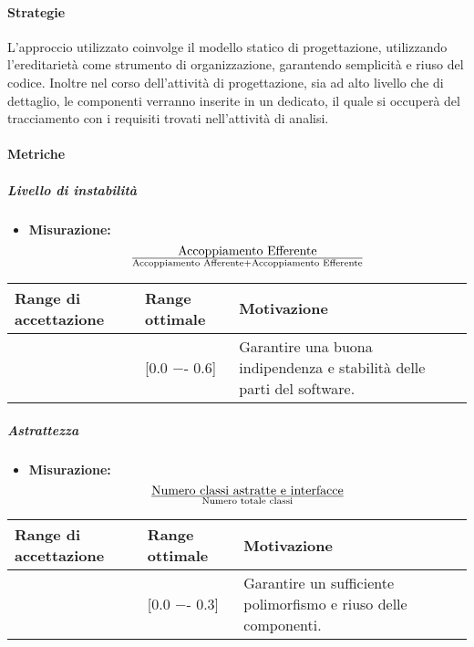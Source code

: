 \paragraph{Strategie}
L'approccio utilizzato coinvolge il modello statico di progettazione, utilizzando l'ereditarietà come strumento di organizzazione, garantendo semplicità e riuso del codice.
Inoltre nel corso dell'attività di progettazione, sia ad alto livello che di dettaglio, le componenti verranno inserite in un  dedicato, il quale si occuperà del tracciamento con i requisiti trovati nell'attività di analisi.


\paragraph{Metriche}

\subparagraph{Livello di instabilità}

\begin{itemize}
\item \textbf{Misurazione:} 
\begin{displaymath}
{\text{Accoppiamento Efferente}}\over{\text{Accoppiamento Afferente} + \text{Accoppiamento Efferente}}
\end{displaymath} 
\end{itemize}

\begin{center}
		\begin{tabular}{|P{2.5cm}|P{2.5cm}|P{6cm}|}
		\hline
			\textbf{Range di accettazione}	& \textbf{Range ottimale} & \textbf{Motivazione} \\
			\hline
			[0.0 −- 1] & [0.0 −- 0.6] &	Garantire una buona indipendenza e stabilità delle parti del software. \\
			\hline
			\end{tabular}
\end{center}

\subparagraph{Astrattezza}

\begin{itemize}
\item \textbf{Misurazione:}
\begin{displaymath}
{\text{Numero classi astratte e interfacce}}\over{\text{Numero totale classi}}
\end{displaymath}
\end{itemize}

\begin{center}
		\begin{tabular}{|P{2.5cm}|P{2.5cm}|P{6cm}|}
		\hline
			\textbf{Range di accettazione}	& \textbf{Range ottimale} & \textbf{Motivazione} \\
			\hline
			[0.0 −- 0.8] & [0.0 −- 0.3] &	Garantire un sufficiente polimorfismo e riuso delle componenti. \\
			\hline
			\end{tabular}
\end{center}

